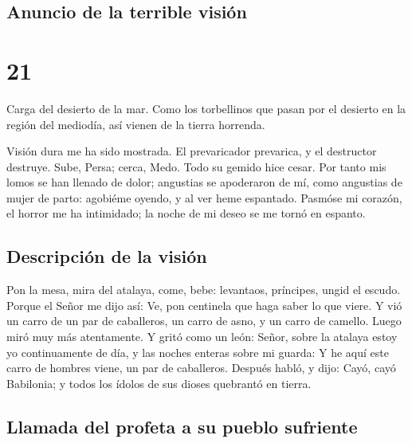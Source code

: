 \hypertarget{anuncio-de-la-terrible-visiuxf3n}{%
\subsection{Anuncio de la terrible
visión}\label{anuncio-de-la-terrible-visiuxf3n}}

\hypertarget{section-23-21}{%
\section{21}\label{section-23-21}}

 Carga del desierto de la mar. Como los torbellinos que
pasan por el desierto en la región del mediodía, así vienen de la tierra
horrenda.

 Visión dura me ha sido mostrada. El prevaricador
prevarica, y el destructor destruye. Sube, Persa; cerca, Medo. Todo su
gemido hice cesar.  Por tanto mis lomos se han llenado de
dolor; angustias se apoderaron de mí, como angustias de mujer de parto:
agobiéme oyendo, y al ver heme espantado.  Pasmóse mi
corazón, el horror me ha intimidado; la noche de mi deseo se me tornó en
espanto.

\hypertarget{descripciuxf3n-de-la-visiuxf3n}{%
\subsection{Descripción de la
visión}\label{descripciuxf3n-de-la-visiuxf3n}}

 Pon la mesa, mira del atalaya, come, bebe: levantaos,
príncipes, ungid el escudo.  Porque el Señor me dijo así:
Ve, pon centinela que haga saber lo que viere.  Y vió un
carro de un par de caballeros, un carro de asno, y un carro de camello.
Luego miró muy más atentamente.  Y gritó como un león:
Señor, sobre la atalaya estoy yo continuamente de día, y las noches
enteras sobre mi guarda:  Y he aquí este carro de hombres
viene, un par de caballeros. Después habló, y dijo: Cayó, cayó
Babilonia; y todos los ídolos de sus dioses quebrantó en tierra.

\hypertarget{llamada-del-profeta-a-su-pueblo-sufriente}{%
\subsection{Llamada del profeta a su pueblo
sufriente}\label{llamada-del-profeta-a-su-pueblo-sufriente}}

